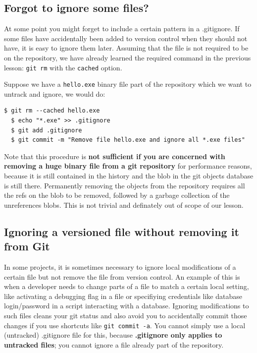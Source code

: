 \documentclass{../common/tufte-latex/tufte-handout}
\begin{document}
\subsection{Forgot to ignore some files?}
At some point you might forget to include a certain pattern in a .gitignore.
If some files have accidentally been added to version control when they should not have, it is easy to ignore them later.
Assuming that the file is not required to be on the repository, we have already learned the required command in the previous lesson: \texttt{git rm} with the \texttt{cached} option.

Suppose we have a \texttt{hello.exe} binary file part of the repository which we want to untrack and ignore, we would do:
\begin{lstlisting}[style=BashInputStyle]
  $ git rm --cached hello.exe
  $ echo "*.exe" >> .gitignore
  $ git add .gitignore
  $ git commit -m "Remove file hello.exe and ignore all *.exe files"
\end{lstlisting}

Note that this procedure is \textbf{not sufficient if you are concerned with removing a huge binary file from a git repository} for performance reasons, because it is still contained in the history and the blob in the git objects database is still there.
Permanently removing the objects from the repository requires all the refs on the blob to be removed, followed by a garbage collection of the unreferences blobs.
This is not trivial and definately out of scope of our lesson.

\subsection{Ignoring a versioned file without removing it from Git}
In some projects, it is sometimes necessary to ignore local modifications of a certain file but not remove the file from version control.
An example of this is when a developer needs to change parts of a file to match a certain local setting, like activating a debugging flag in a file or specifiying credentials like database login/password in a script interacting with a database.
Ignoring modifications to such files cleans your git status and also avoid you to accidentally commit those changes if you use shortcuts like \texttt{git commit -a}.
You cannot simply use a local (untracked) .gitignore file for this, because \textbf{.gitignore only applies to untracked files}; you cannot ignore a file already part of the repository.
\end{document}

